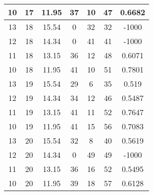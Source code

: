 \documentclass[letterpaper, 12pt]{article}
\begin{document}
\begin{longtable}{|c|c|c|c|c|c|c|}
10 & 17 & 11.95 & 37 & 10 & 47 & 0.6682 \\
\hline
13 & 18 & 15.54 & 0 & 32 & 32 & -1000 \\
\hline
12 & 18 & 14.34 & 0 & 41 & 41 & -1000 \\
\hline
11 & 18 & 13.15 & 36 & 12 & 48 & 0.6071 \\
\hline
10 & 18 & 11.95 & 41 & 10 & 51 & 0.7801 \\
\hline
13 & 19 & 15.54 & 29 & 6 & 35 & 0.519 \\
\hline
12 & 19 & 14.34 & 34 & 12 & 46 & 0.5487 \\
\hline
11 & 19 & 13.15 & 41 & 11 & 52 & 0.7647 \\
\hline
10 & 19 & 11.95 & 41 & 15 & 56 & 0.7083 \\
\hline
13 & 20 & 15.54 & 32 & 8 & 40 & 0.5619 \\
\hline
12 & 20 & 14.34 & 0 & 49 & 49 & -1000 \\
\hline
11 & 20 & 13.15 & 36 & 16 & 52 & 0.5495 \\
\hline
10 & 20 & 11.95 & 39 & 18 & 57 & 0.6128 \\
\hline
\end{longtable}
\end{document}
